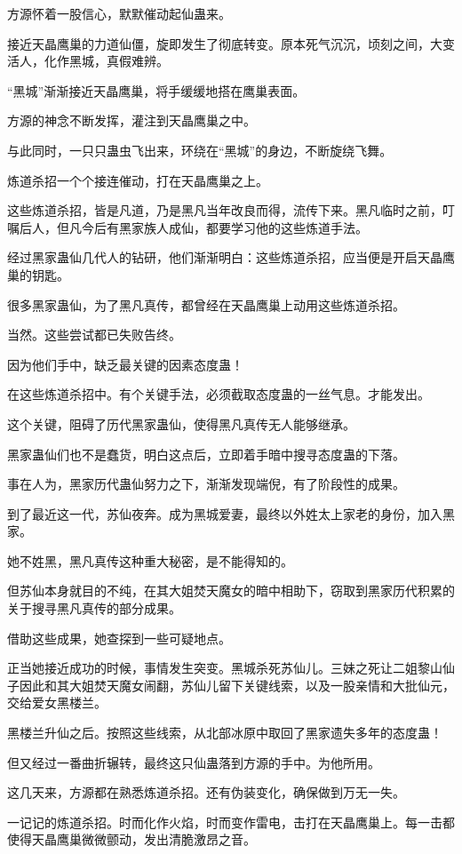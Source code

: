 \begin{this_body}
方源怀着一股信心，默默催动起仙蛊来。

接近天晶鹰巢的力道仙僵，旋即发生了彻底转变。原本死气沉沉，顷刻之间，大变活人，化作黑城，真假难辨。

“黑城”渐渐接近天晶鹰巢，将手缓缓地搭在鹰巢表面。

方源的神念不断发挥，灌注到天晶鹰巢之中。

与此同时，一只只蛊虫飞出来，环绕在“黑城”的身边，不断旋绕飞舞。

炼道杀招一个个接连催动，打在天晶鹰巢之上。

这些炼道杀招，皆是凡道，乃是黑凡当年改良而得，流传下来。黑凡临时之前，叮嘱后人，但凡今后有黑家族人成仙，都要学习他的这些炼道手法。

经过黑家蛊仙几代人的钻研，他们渐渐明白：这些炼道杀招，应当便是开启天晶鹰巢的钥匙。

很多黑家蛊仙，为了黑凡真传，都曾经在天晶鹰巢上动用这些炼道杀招。

当然。这些尝试都已失败告终。

因为他们手中，缺乏最关键的因素态度蛊！

在这些炼道杀招中。有个关键手法，必须截取态度蛊的一丝气息。才能发出。

这个关键，阻碍了历代黑家蛊仙，使得黑凡真传无人能够继承。

黑家蛊仙们也不是蠢货，明白这点后，立即着手暗中搜寻态度蛊的下落。

事在人为，黑家历代蛊仙努力之下，渐渐发现端倪，有了阶段性的成果。

到了最近这一代，苏仙夜奔。成为黑城爱妻，最终以外姓太上家老的身份，加入黑家。

她不姓黑，黑凡真传这种重大秘密，是不能得知的。

但苏仙本身就目的不纯，在其大姐焚天魔女的暗中相助下，窃取到黑家历代积累的关于搜寻黑凡真传的部分成果。

借助这些成果，她查探到一些可疑地点。

正当她接近成功的时候，事情发生突变。黑城杀死苏仙儿。三妹之死让二姐黎山仙子因此和其大姐焚天魔女闹翻，苏仙儿留下关键线索，以及一股亲情和大批仙元，交给爱女黑楼兰。

黑楼兰升仙之后。按照这些线索，从北部冰原中取回了黑家遗失多年的态度蛊！

但又经过一番曲折辗转，最终这只仙蛊落到方源的手中。为他所用。

这几天来，方源都在熟悉炼道杀招。还有伪装变化，确保做到万无一失。

一记记的炼道杀招。时而化作火焰，时而变作雷电，击打在天晶鹰巢上。每一击都使得天晶鹰巢微微颤动，发出清脆激昂之音。


\end{this_body}
